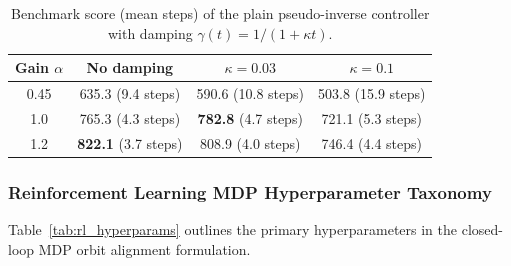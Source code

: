 \documentclass[11pt,a4paper]{article}
\begin{document}
\begin{table}[h!]
\centering
\small
\begin{tabular}{@{}cccc@{}}
\toprule
\textbf{Gain $\alpha$} & \textbf{No damping} & \textbf{$\kappa = 0.03$} & \textbf{$\kappa = 0.1$} \\
\midrule
0.45 & 635.3 (9.4 steps) & 590.6 (10.8 steps) & 503.8 (15.9 steps) \\
1.0 & 765.3 (4.3 steps) & \textbf{782.8} (4.7 steps) & 721.1 (5.3 steps) \\
1.2 & \textbf{822.1} (3.7 steps) & 808.9 (4.0 steps) & 746.4 (4.4 steps) \\
\bottomrule
\end{tabular}
\caption{Benchmark score (mean steps) of the plain pseudo-inverse controller with damping $\gamma(t) = 1/(1 + \kappa t)$.}
\label{tab:damping}
\end{table}

\subsubsection{Reinforcement Learning MDP Hyperparameter Taxonomy}
Table~\ref{tab:rl_hyperparams} outlines the primary hyperparameters in the closed-loop MDP orbit alignment formulation.
\end{document}

